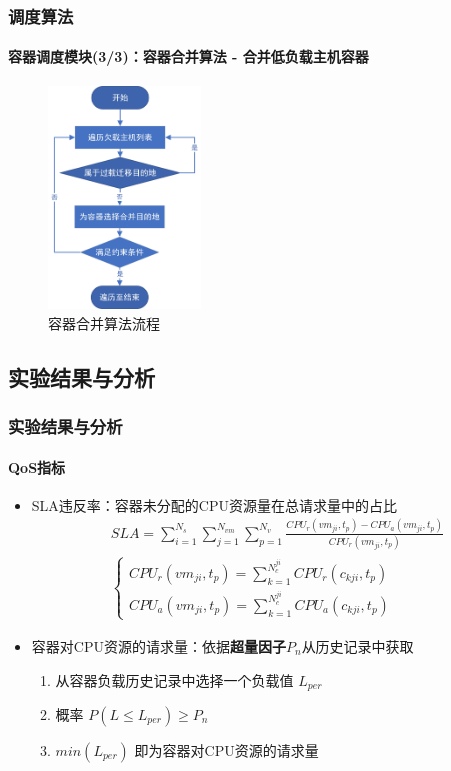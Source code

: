 \begin{frame}
\frametitle{调度算法}
\framesubtitle{容器调度模块(3/3)：容器合并算法 - 合并低负载主机容器}
\begin{figure}[htb]
    \centering
    \includegraphics[width=0.36\textwidth]{figures/fig_4_4.jpg}
    \caption{容器合并算法流程}
    \label{fig:fig_4_4}
\end{figure}
\end{frame}

\subsection{实验结果与分析}

\begin{frame}
\frametitle{实验结果与分析}
\framesubtitle{QoS指标}
\begin{itemize}
    \item SLA违反率：容器未分配的CPU资源量在总请求量中的占比
    \begin{equation}
    \begin{align*}
        &SLA = \sum_{i=1}^{N_s}\sum_{j=1}^{N_{vm}}\sum_{p=1}^{N_v}
        \frac{CPU_r(vm_{ji},t_p) - CPU_a(vm_{ji},t_p)}{CPU_r(vm_{ji},t_p)} \\
        &\begin{cases}
            CPU_r(vm_{ji},t_p) = \sum_{k=1}^{N_c^{ji}}CPU_r(c_{kji},t_p) \\
            CPU_a(vm_{ji},t_p) = \sum_{k=1}^{N_c^{ji}}CPU_a(c_{kji},t_p)
        \end{cases}
    \end{align*}
    \end{equation}
    \item 容器对CPU资源的请求量：依据\textbf{超量因子}$P_n$从历史记录中获取
        \begin{enumerate}
            \item 从容器负载历史记录中选择一个负载值 $L_{per}$
            \item 概率 $P(L \le L_{per}) \ge P_n$
            \item $min(L_{per})$ 即为容器对CPU资源的请求量
        \end{enumerate}
\end{itemize}
\end{frame}

